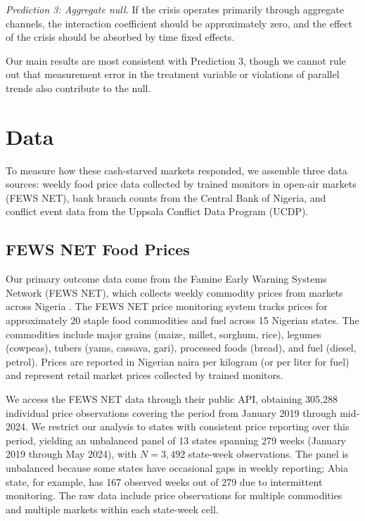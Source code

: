 \documentclass[12pt]{article}
\begin{document}
\textit{Prediction 3: Aggregate null.} If the crisis operates primarily through aggregate channels, the interaction coefficient should be approximately zero, and the effect of the crisis should be absorbed by time fixed effects.

Our main results are most consistent with Prediction 3, though we cannot rule out that measurement error in the treatment variable or violations of parallel trends also contribute to the null.


\section{Data}

To measure how these cash-starved markets responded, we assemble three data sources: weekly food price data collected by trained monitors in open-air markets (FEWS NET), bank branch counts from the Central Bank of Nigeria, and conflict event data from the Uppsala Conflict Data Program (UCDP).

\subsection{FEWS NET Food Prices}

Our primary outcome data come from the Famine Early Warning Systems Network (FEWS NET), which collects weekly commodity prices from markets across Nigeria \citep{fewsnet2024}. The FEWS NET price monitoring system tracks prices for approximately 20 staple food commodities and fuel across 15 Nigerian states. The commodities include major grains (maize, millet, sorghum, rice), legumes (cowpeas), tubers (yams, cassava, gari), processed foods (bread), and fuel (diesel, petrol). Prices are reported in Nigerian naira per kilogram (or per liter for fuel) and represent retail market prices collected by trained monitors.

We access the FEWS NET data through their public API, obtaining 305,288 individual price observations covering the period from January 2019 through mid-2024. We restrict our analysis to states with consistent price reporting over this period, yielding an unbalanced panel of 13 states spanning 279 weeks (January 2019 through May 2024), with $N = 3{,}492$ state-week observations. The panel is unbalanced because some states have occasional gaps in weekly reporting; Abia state, for example, has 167 observed weeks out of 279 due to intermittent monitoring. The raw data include price observations for multiple commodities and multiple markets within each state-week cell.
\end{document}

